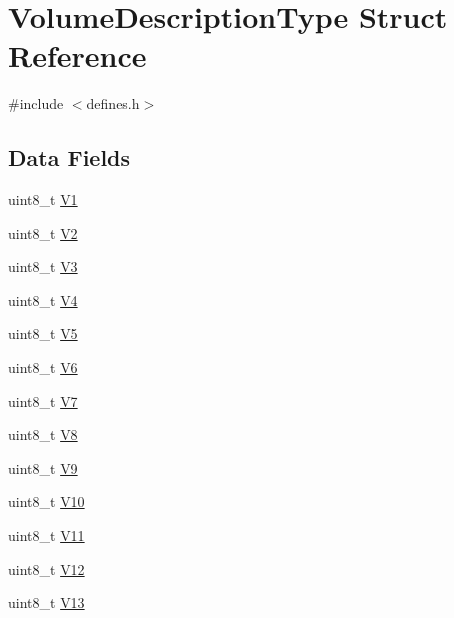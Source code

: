 \hypertarget{structVolumeDescriptionType}{\section{Volume\-Description\-Type Struct Reference}
\label{structVolumeDescriptionType}
}


{\ttfamily \#include $<$defines.\-h$>$}

\subsection*{Data Fields}
\begin{DoxyCompactItemize}
\item 
uint8\-\_\-t \hyperlink{structVolumeDescriptionType_a179b7af780dd2a93dcb095d12690f6fa}{V1}
\item 
uint8\-\_\-t \hyperlink{structVolumeDescriptionType_a0c89f2c3b579944fb549107411d97213}{V2}
\item 
uint8\-\_\-t \hyperlink{structVolumeDescriptionType_a2a6a98d42bff4b72a02f562f1be113d2}{V3}
\item 
uint8\-\_\-t \hyperlink{structVolumeDescriptionType_ad10e9650afd43567c2b3b709d72f5dec}{V4}
\item 
uint8\-\_\-t \hyperlink{structVolumeDescriptionType_a986e346428396e0c131a9f200f472716}{V5}
\item 
uint8\-\_\-t \hyperlink{structVolumeDescriptionType_a3f925228651ced5c0e7c373ec6573162}{V6}
\item 
uint8\-\_\-t \hyperlink{structVolumeDescriptionType_a5d057bc3e9f6537234dfb904c740c68f}{V7}
\item 
uint8\-\_\-t \hyperlink{structVolumeDescriptionType_a86597a2edf96558d4176afc6ac3a0565}{V8}
\item 
uint8\-\_\-t \hyperlink{structVolumeDescriptionType_a8db8489c65036975ec2ebe01734310be}{V9}
\item 
uint8\-\_\-t \hyperlink{structVolumeDescriptionType_ac75ed59ba452ed86278e43e6fc5adec1}{V10}
\item 
uint8\-\_\-t \hyperlink{structVolumeDescriptionType_ad9ead8ed6e1eff85d9f1fde20c0ba60d}{V11}
\item 
uint8\-\_\-t \hyperlink{structVolumeDescriptionType_a96c6874117e4b64341e6c207bde061ae}{V12}
\item 
uint8\-\_\-t \hyperlink{structVolumeDescriptionType_ad3a75e21b674eadfa0db9d9df9672e16}{V13}
\end{DoxyCompactItemize}



